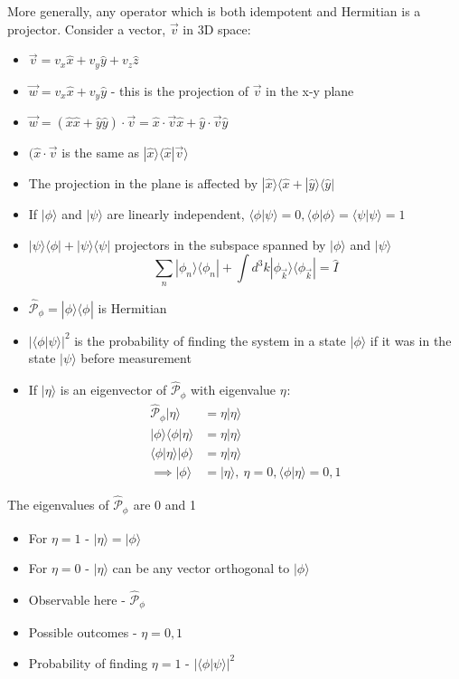 \documentclass[a4paper,11pt,normalem]{article}
\begin{document}
More generally, any operator which is both idempotent and Hermitian is a
projector.
Consider a vector, \(\vec{v}\) in 3D space:
\begin{itemize}
    \item \(\vec{v} = v_x\hat{x} + v_y\hat{y} + v_z\hat{z}\) 
    \item \(\vec{w} = v_x\hat{x} + v_y\hat{y}\) - this is the projection of \(\vec{v}\) in the x-y plane 
    \item \(\vec{w} = (\hat{x}\hat{x} + \hat{y}\hat{y})\cdot\vec{v} = \hat{x}\cdot\vec{v} \hat{x} + \hat{y}\cdot\vec{v} \hat{y}\)
    \item \((\hat{x}\cdot\vec{v}\) is the same as \(|\hat{x}\rangle\langle\hat{x}|\vec{v}\rangle\)
    \item The projection in the plane is affected by \(|\hat{x}\rangle\langle\hat{x} + |\hat{y}\rangle\langle\hat{y}|\) 
    \item If \(|\phi\rangle\) and \(|\psi\rangle\) are linearly independent, \(\langle\phi|\psi\rangle = 0, \langle\phi|\phi\rangle = \langle\psi|\psi\rangle = 1\)
    \item \(|\psi\rangle\langle\phi| + |\psi\rangle\langle\psi|\) projectors in the subspace spanned by \(|\phi\rangle\) and \(|\psi\rangle\)
\[
    \sum_n |\phi_n\rangle\langle\phi_n| + \int d^3k |\phi_{\vec{k}}\rangle\langle\phi_{\vec{k}}| = \hat{I}
\]
\item
  \(\hat{\mathcal{P}}_{\phi} = |\phi\rangle\langle\phi_{}|\) is
  Hermitian
\item
  \(|\langle\phi|\psi\rangle|^2\) is the probability of finding the
  system in a state \(|\phi\rangle\) if it was in the state
  \(|\psi\rangle\) before measurement
\item
  If \(|\eta\rangle\) is an eigenvector of \(\hat{\mathcal{P}}_{\phi}\)
  with eigenvalue \(\eta_{}\):
\[
    \begin{aligned}
    \hat{\mathcal{P}}_{\phi}|\eta\rangle &= \eta|\eta\rangle \\
    |\phi\rangle\langle\phi|\eta\rangle &= \eta|\eta\rangle \\
    \langle\phi|\eta\rangle|\phi\rangle &= \eta|\eta\rangle \\
    \implies |\phi\rangle &= |\eta\rangle,~ \eta = 0,\langle\phi|\eta\rangle = 0,1
    \end{aligned}
\]
\end{itemize}
The eigenvalues of \(\hat{\mathcal{P}}_{\phi_{}}\) are 0 and 1
\begin{itemize}
    \item For \(\eta =1\) - \(|\eta\rangle = |\phi\rangle\) 
    \item For \(\eta = 0\) - \(|\eta\rangle\) can be any vector orthogonal to \(|\phi\rangle\)
\item
  Observable here - \(\hat{\mathcal{P}}_{\phi_{}}\)
\item
  Possible outcomes - \(\eta = 0,1\)
\item
  Probability of finding \(\eta = 1\) - \(|\langle\phi|\psi\rangle|^2\)
\end{itemize}
\end{document}
